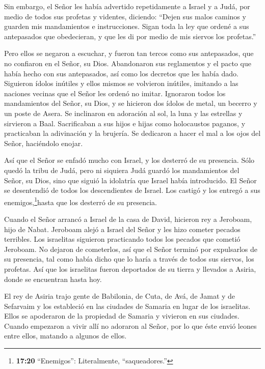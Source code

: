  Sin embargo, el Señor les había advertido repetidamente a
Israel y a Judá, por medio de todos sus profetas y videntes, diciendo:
``Dejen sus malos caminos y guarden mis mandamientos e instrucciones.
Sigan toda la ley que ordené a sus antepasados que obedecieran, y que
les di por medio de mis siervos los profetas.''

 Pero ellos se negaron a escuchar, y fueron tan tercos como
sus antepasados, que no confiaron en el Señor, su Dios. 
Abandonaron sus reglamentos y el pacto que había hecho con sus
antepasados, así como los decretos que les había dado. Siguieron ídolos
inútiles y ellos mismos se volvieron inútiles, imitando a las naciones
vecinas que el Señor les ordenó no imitar.  Ignoraron todos
los mandamientos del Señor, su Dios, y se hicieron dos ídolos de metal,
un becerro y un poste de Asera. Se inclinaron en adoración al sol, la
luna y las estrellas y sirvieron a Baal.  Sacrificaban a
sus hijos e hijas como holocaustos paganos, y practicaban la adivinación
y la brujería. Se dedicaron a hacer el mal a los ojos del Señor,
haciéndolo enojar.

 Así que el Señor se enfadó mucho con Israel, y los
desterró de su presencia. Sólo quedó la tribu de Judá, 
pero ni siquiera Judá guardó los mandamientos del Señor, su Dios, sino
que siguió la idolatría que Israel había introducido.  El
Señor se desentendió de todos los descendientes de Israel. Los castigó y
los entregó a sus enemigos,\footnote{\textbf{17:20} ``Enemigos'':
  Literalmente, ``saqueadores.''}hasta que los desterró de su presencia.

 Cuando el Señor arrancó a Israel de la casa de David,
hicieron rey a Jeroboam, hijo de Nabat. Jeroboam alejó a Israel del
Señor y les hizo cometer pecados terribles.  Los israelitas
siguieron practicando todos los pecados que cometió Jeroboam. No dejaron
de cometerlos,  así que el Señor terminó por expulsarlos de
su presencia, tal como había dicho que lo haría a través de todos sus
siervos, los profetas. Así que los israelitas fueron deportados de su
tierra y llevados a Asiria, donde se encuentran hasta hoy.

 El rey de Asiria trajo gente de Babilonia, de Cuta, de
Avá, de Jamat y de Sefarvaim y los estableció en las ciudades de Samaria
en lugar de los israelitas. Ellos se apoderaron de la propiedad de
Samaria y vivieron en sus ciudades.  Cuando empezaron a
vivir allí no adoraron al Señor, por lo que éste envió leones entre
ellos, matando a algunos de ellos.

